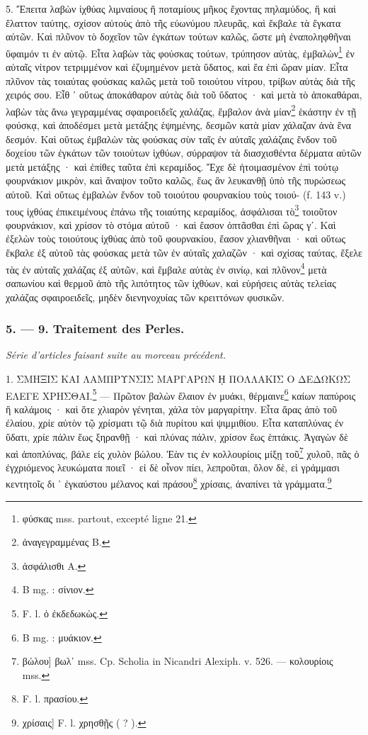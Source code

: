 \documentclass[a4paper, 11pt, oneside, polutonikogreek, french]{article}
\begin{document}
5. Ἔπειτα λαβὼν ἰχθύας λιμναίους ἢ ποταμίους μῆκος ἔχοντας πηλαμύδος, ἢ καὶ ἔλαττον ταύτης, σχίσον αὐτοὺς ἀπὸ τῆς εὐωνύμου πλευρᾶς, καὶ ἔκβαλε τὰ ἔγκατα αὐτῶν. Καὶ πλῦνον τὸ δοχεῖον τῶν ἐγκάτων τούτων καλῶς, ὥστε μὴ ἐναποληφθῆναι ὕφαιμόν τι ἐν αὐτῷ. Εἶτα λαβὼν τὰς φούσκας τούτων, τρύπησον αὐτὰς, ἐμβαλὼν\footnote{φύσκας mss. partout, excepté ligne 21.} ἐν αὐταῖς νίτρον τετριμμένον καὶ ἐζυμημένον μετὰ ὕδατος, καὶ ἔα ἐπὶ ὥραν μίαν. Εἶτα πλῦνον τὰς τοιαύτας φούσκας καλῶς μετὰ τοῦ τοιούτου νίτρου, τρίβων αὐτὰς διὰ τῆς χειρός σου. Εἶθ ᾽ οὕτως ἀποκάθαρον αὐτὰς διὰ τοῦ ὕδατος · καὶ μετὰ τὸ ἀποκαθάραι, λαβὼν τὰς ἄνω γεγραμμένας σφαιροειδεῖς χαλάζας, ἔμβαλον ἀνὰ μίαν\footnote{ἀναγεγραμμένας B.} ἑκάστην ἐν τῇ φούσκᾳ, καὶ ἀποδέσμει μετὰ μετάξης ἑψημένης, δεσμῶν κατὰ μίαν χάλαζαν ἀνὰ ἕνα δεσμόν. Καὶ οὕτως ἐμβαλὼν τὰς φούσκας σὺν ταῖς ἐν αὐταῖς χαλάζαις ἔνδον τοῦ δοχείου τῶν ἐγκάτων τῶν τοιούτων ἰχθύων, σύρραψον τὰ διασχισθέντα δέρματα αὐτῶν μετὰ μετάξης · καὶ ἐπίθες ταῦτα ἐπὶ κεραμίδος. Ἔχε δὲ ἡτοιμασμένον ἐπὶ τούτῳ φουρνάκιον μικρὸν, καὶ ἄναψον τοῦτο καλῶς, ἕως ἂν λευκανθῇ ὑπὸ τῆς πυρώσεως αὐτοῦ. Καὶ οὕτως ἐμβαλὼν ἔνδον τοῦ τοιούτου φουρνακίου τοὺς τοιού- (f. 143 v.) τους ἰχθύας ἐπικειμένους ἐπάνω τῆς τοιαύτης κεραμίδος, ἀσφάλισαι τὸ\footnote{ἀσφάλισθι A.} τοιοῦτον φουρνάκιον, καὶ χρίσον τὸ στόμα αὐτοῦ · καὶ ἔασον ὀπτᾶσθαι ἐπὶ ὥρας γʹ. Καὶ ἐξελὼν τοὺς τοιούτους ἰχθύας ἀπὸ τοῦ φουρνακίου, ἔασον χλιανθῆναι · καὶ οὕτως ἔκβαλε ἐξ αὐτοῦ τὰς φούσκας μετὰ τῶν ἐν αὐταῖς χαλαζῶν · καὶ σχίσας ταύτας, ἔξελε τὰς ἐν αὐταῖς χαλάζας ἐξ αὐτῶν, καὶ ἔμβαλε αὐτὰς ἐν σινίῳ, καὶ πλῦνον\footnote{B mg. : σίνιον.} μετὰ σαπωνίου καὶ θερμοῦ ἀπὸ τῆς λιπότητος τῶν ἰχθύων, καὶ εὑρήσεις αὐτὰς τελείας χαλάζας σφαιροειδεῖς, μηδὲν διενηνοχυίας τῶν κρειττόνων φυσικῶν.

\bigskip
\centerline{\EightStarTaper}
\centerline{\EightStarTaper\EightStarTaper}
\bigskip

\subsubsection{5. --- 9. Traitement des Perles.}

\emph{Série d'articles faisant suite au morceau précédent.}

\bigskip

1. ΣΜΗΞΙΣ ΚΑΙ ΛΑΜΠΡΥΝΣΙΣ ΜΑΡΓΑΡΩΝ ῌ ΠΟΛΛΑΚΙΣ Ο ΔΕΔΩΚΩΣ ΕΛΕΓΕ ΧΡΗΣΘΑΙ.\footnote{F. l. ὁ ἐκδεδωκὼς.} --- Πρῶτον βαλὼν ἔλαιον ἐν μυάκι, θέρμαινε\footnote{B mg. : μυάκιον.} καίων παπύροις ἢ καλάμοις · καὶ ὅτε χλιαρὸν γένηται, χάλα τὸν μαργαρίτην. Εἶτα ἄρας ἀπὸ τοῦ ἐλαίου, χρίε αὐτὸν τῷ χρίσματι τῷ διὰ πυρίτου καὶ ψιμμιθίου. Εἶτα καταπλύνας ἐν ὕδατι, χρίε πάλιν ἕως ξηρανθῇ · καὶ πλύνας πάλιν, χρίσον ἕως ἑπτάκις. Ἀγαγὼν δὲ καὶ ἀποπλύνας, βάλε εἰς χυλὸν βώλου. Ἐὰν τις ἐν κολλουρίοις μίξῃ τοῦ\footnote{βώλου] βωλʹ mss. Cp. Scholia in Nicandri Alexiph. v. 526. --- κολουρίοις mss.} χυλοῦ, πᾶς ὁ ἐγχριόμενος λευκώματα ποιεῖ · εἰ δὲ οἶνον πίει, λεπροῦται, ὅλον δὲ, εἰ γράμμασι κεντητοῖς δι ᾽ ἐγκαύστου μέλανος καὶ πράσου\footnote{F. l. πρασίου.} χρίσαις, ἀναπίνει τὰ γράμματα.\footnote{χρίσαις] F. l. χρησθῇς ( ? ).}
\end{document}

